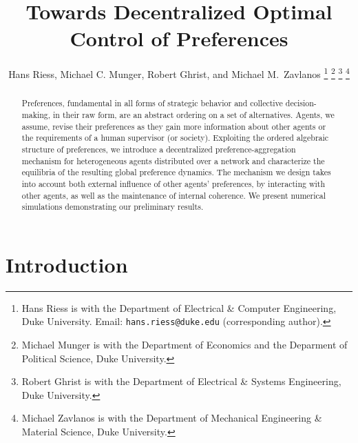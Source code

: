\documentclass[conference]{ieeeconf}
\begin{document}
\title{\bf Towards Decentralized Optimal Control of Preferences}

\author{Hans Riess, Michael C. Munger, Robert Ghrist, and Michael M.~Zavlanos%
\thanks{Hans Riess is with the Department of Electrical \& Computer Engineering, Duke University. Email: {\tt hans.riess@duke.edu} (corresponding author).}%
\thanks{Michael Munger is with the Department of Economics and the Deparment of Political Science, Duke University.}%
\thanks{Robert Ghrist is with the Department of Electrical \& Systems Engineering, Duke University.}%
\thanks{Michael Zavlanos is with the Department of Mechanical Engineering \& Material Science, Duke University.}%
}
\maketitle

\begin{abstract}
Preferences, fundamental in all forms of strategic behavior and collective decision-making, in their raw form, are an abstract ordering on a set of alternatives. Agents, we assume, revise their preferences as they gain more information about other agents or the requirements of a human supervisor (or society). Exploiting the ordered algebraic structure of preferences,  we introduce a decentralized preference-aggregation mechanism for heterogeneous agents distributed over a network and characterize the equilibria of the resulting global preference dynamics. The mechanism we design takes into account both external influence of other agents' preferences, by interacting with other agents, as well as the maintenance of internal coherence. We present numerical simulations demonstrating our preliminary results.
\end{abstract}


\section{Introduction}
\end{document}
